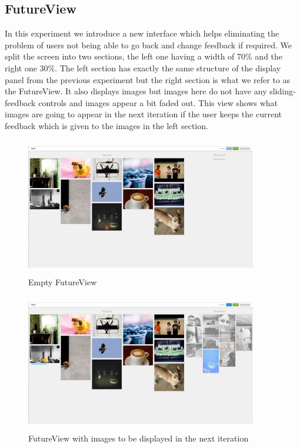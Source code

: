 \documentclass[english]{tktltiki}
\begin{document}
\subsection{FutureView}

In this experiment we introduce a new interface which helps eliminating the problem of users not being able to go back and change feedback if required. We split the screen into two sections, the left one having a width of 70\% and the right one 30\%. The left section has exactly the same structure of the display panel from the previous experiment but the right section is what we refer to as the FutureView. It also displays images but images here do not have any sliding-feedback controls and images appear a bit faded out. This view shows what images are going to appear in the next iteration if the user keeps the current feedback which is given to the images in the left section.

\begin{figure}[h!]
  \centering
    \includegraphics[width=0.90\textwidth,height=6cm]{figures/future_sample_1.jpg}
    \caption{Empty FutureView}
    \label{fut_samp_1}
\end{figure}

\begin{figure}[h!]
  \centering
    \includegraphics[width=0.90\textwidth,height=6cm]{figures/future_sample_2.jpg}
    \caption{FutureView with images to be displayed in the next iteration}
    \label{fut_samp_2}
\end{figure}
\end{document}
